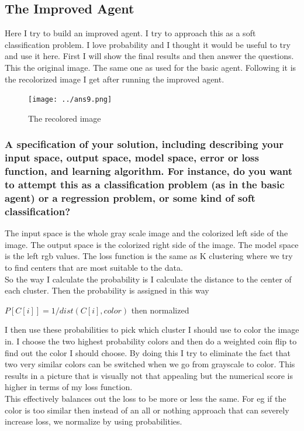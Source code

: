 \documentclass[12pt]{article} %
\begin{document}
\subsection{The Improved Agent}
Here I try to build an improved agent. I try to approach this as a soft classification problem. I love probability and I thought it would be useful to try and use it here. First I will show the final results and then answer the questions.\\

This the original image. The same one as used for the basic agent. Following it is the recolorized image I get after running the improved agent.

\begin{figure}[H]
\centering
\texttt{[image: ../ans9.png]}
\caption{The recolored image \label{overflow}}
\end{figure}

\subsubsection{A specification of your solution, including describing your input space, output space, model space, error or
loss function, and learning algorithm. For instance, do you want to attempt this as a classification
problem (as in the basic agent) or a regression problem, or some kind of soft classification?}
The input space is the whole gray scale image and the colorized left side of the image. The output space is the colorized right side of the image. The model space is the left rgb values. The loss function is the same as K clustering where we try to find centers that are most suitable to the data. \\
So the way I calculate the probability is I calculate the distance to the center of each  cluster. Then the probability is assigned in this way
\begin{center}
$P[C[i]] = 1/dist(C[i], color)$ then normalized
\end{center}
I then use these probabilities to pick which cluster I should use to color the image in. I choose the two highest probability colors and then do a weighted coin flip to find out the color I should choose. By doing this I try to eliminate the fact that two very similar colors can be switched when we go from grayscale to color. This results in a picture that is visually not that appealing but the numerical score is higher in terms of my loss function.\\
This effectively balances out the loss to be more or less the same. For eg if the color is too similar then instead of an all or nothing approach that can severely increase loss, we normalize by using probabilities.
\end{document}
